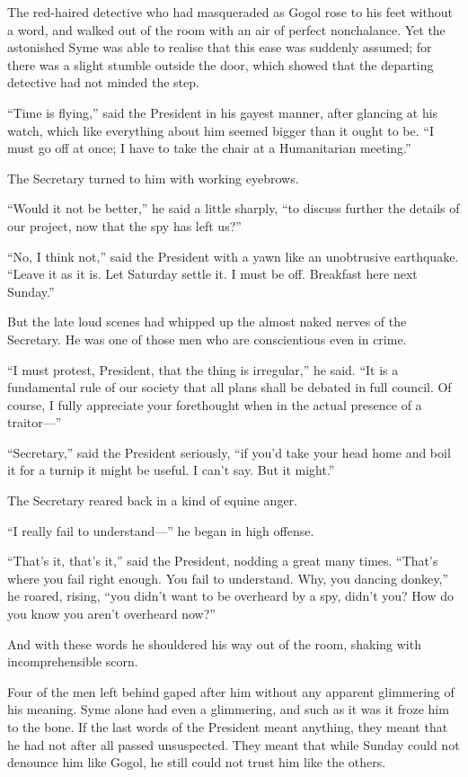 The red-haired detective who had masqueraded as Gogol rose to his feet without a word, and walked out of the room with an air of perfect nonchalance. Yet the astonished Syme was able to realise that this ease was suddenly assumed; for there was a slight stumble outside the door, which showed that the departing detective had not minded the step.

“Time is flying,” said the President in his gayest manner, after glancing at his watch, which like everything about him seemed bigger than it ought to be. “I must go off at once; I have to take the chair at a Humanitarian meeting.”

The Secretary turned to him with working eyebrows.

“Would it not be better,” he said a little sharply, “to discuss further the details of our project, now that the spy has left us?”

“No, I think not,” said the President with a yawn like an unobtrusive earthquake. “Leave it as it is. Let Saturday settle it. I must be off. Breakfast here next Sunday.”

But the late loud scenes had whipped up the almost naked nerves of the Secretary. He was one of those men who are conscientious even in crime.

“I must protest, President, that the thing is irregular,” he said. “It is a fundamental rule of our society that all plans shall be debated in full council. Of course, I fully appreciate your forethought when in the actual presence of a traitor⁠—”

“Secretary,” said the President seriously, “if you’d take your head home and boil it for a turnip it might be useful. I can’t say. But it might.”

The Secretary reared back in a kind of equine anger.

“I really fail to understand⁠—” he began in high offense.

“That’s it, that’s it,” said the President, nodding a great many times. “That’s where you fail right enough. You fail to understand. Why, you dancing donkey,” he roared, rising, “you didn’t want to be overheard by a spy, didn’t you? How do you know you aren’t overheard now?”

And with these words he shouldered his way out of the room, shaking with incomprehensible scorn.

Four of the men left behind gaped after him without any apparent glimmering of his meaning. Syme alone had even a glimmering, and such as it was it froze him to the bone. If the last words of the President meant anything, they meant that he had not after all passed unsuspected. They meant that while Sunday could not denounce him like Gogol, he still could not trust him like the others.

